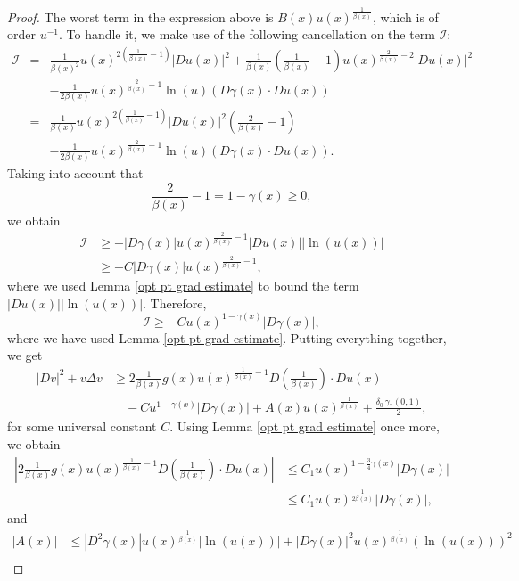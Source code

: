 \documentclass[10pt,a4paper]{amsart}
\begin{document}
\begin{proof}
The worst term in the expression above is $B(x) u(x)^{\frac{1}{\beta(x)}}$, which is of order $u^{-1}$. To handle it, we make use of the following cancellation on the term $\mathcal{I}$:
\begin{eqnarray*}
	\mathcal{I} & = & \frac{1}{\beta(x)^2}u(x)^{2\left(\frac{1}{\beta(x)}-1\right)}|Du(x)|^2 + \frac{1}{\beta(x)}\left(\frac{1}{\beta(x)}-1 \right)u(x)^{\frac{2}{\beta(x)}-2}|Du(x)|^2\\
	& & - \frac{1}{2\beta(x)}u(x)^{\frac{2}{\beta(x)}-1}\ln(u) \left(D\gamma(x)\cdot Du(x)\right)\\
	& = & \frac{1}{\beta(x)}u(x)^{2\left(\frac{1}{\beta(x)}-1\right)}|Du(x)|^2\left(\frac{2}{\beta(x)} - 1 \right)\\
	& & - \frac{1}{2\beta(x)}u(x)^{\frac{2}{\beta(x)}-1}\ln(u) \left(D\gamma(x)\cdot Du(x)\right).
\end{eqnarray*}
Taking into account that 
$$
	\frac{2}{\beta(x)} - 1  = 1 - \gamma(x) \geq 0,
$$
we obtain
\begin{align*}
   \mathcal{I} & \geq -|D\gamma(x)|u(x)^{\frac{2}{\beta(x)}-1}|Du(x)||\ln(u(x))|\\
               & \geq - C |D\gamma(x)|u(x)^{\frac{2}{\beta(x)}-1},               
\end{align*}
where we used Lemma \ref{opt pt grad estimate} to bound the term $|Du(x)||\ln(u(x))|$. Therefore,
$$
	\mathcal{I} \geq -Cu(x)^{1-\gamma(x)}|D\gamma(x)|,
$$
where we have used Lemma \ref{opt pt grad estimate}. Putting everything together, we get
\begin{align*}
         |Dv|^2 + v \Delta v & \geq  \displaystyle  2\frac{1}{\beta(x)}g(x)u(x)^{\frac{1}{\beta(x)} - 1}D\left(\frac{1}{\beta(x)}\right) \cdot Du(x)\\
         & \quad - Cu^{1-\gamma(x)}|D\gamma(x)|  + A(x)u(x)^{\frac{1}{\beta(x)}} + \frac{\delta_0 \, \gamma_\ast (0,1)}{2},
\end{align*}
for some universal constant $C$. Using Lemma \ref{opt pt grad estimate} once more, we obtain
\begin{align*}
    \left|2 \frac{1}{\beta(x)} g(x)u(x)^{\frac{1}{\beta(x)} - 1} D\left(\frac{1}{\beta(x)} \right) \cdot Du(x)  \right|& \leq  C_1 u(x)^{1-\frac{3}{4}\gamma(x)} |D\gamma(x)|\\
    & \leq C_1 u(x)^{\frac{1}{2\beta(x)}}|D\gamma(x)|,
\end{align*}
and
\begin{align*}
	|A(x)| & \leq  |D^2\gamma(x)|u(x)^{\frac{1}{\beta(x)}}|\ln(u(x))| + |D\gamma(x)|^2u(x)^{\frac{1}{\beta(x)}}(\ln(u(x)))^2\\

\end{align*}
\end{proof}
\end{document}
